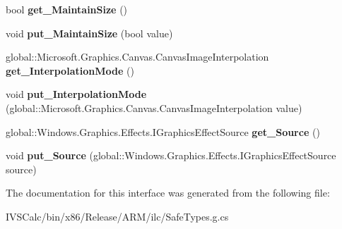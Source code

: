 \begin{DoxyCompactItemize}
bool {\bfseries get\+\_\+\+Maintain\+Size} ()
\item 
\mbox{\label{interface_microsoft_1_1_graphics_1_1_canvas_1_1_effects_1_1_i_straighten_effect_a0d1aa7dfd257a41c147868cb49446ea6}} 
void {\bfseries put\+\_\+\+Maintain\+Size} (bool value)
\item 
\mbox{\label{interface_microsoft_1_1_graphics_1_1_canvas_1_1_effects_1_1_i_straighten_effect_aea853ec4accf5f13bcfef15bd59e5170}} 
global\+::\+Microsoft.\+Graphics.\+Canvas.\+Canvas\+Image\+Interpolation {\bfseries get\+\_\+\+Interpolation\+Mode} ()
\item 
\mbox{\label{interface_microsoft_1_1_graphics_1_1_canvas_1_1_effects_1_1_i_straighten_effect_ac4bd6a5d0b94a9b353c7cf0854c55f83}} 
void {\bfseries put\+\_\+\+Interpolation\+Mode} (global\+::\+Microsoft.\+Graphics.\+Canvas.\+Canvas\+Image\+Interpolation value)
\item 
\mbox{\label{interface_microsoft_1_1_graphics_1_1_canvas_1_1_effects_1_1_i_straighten_effect_a24ea3cfd1f2bd3a3cff7beeb3a4788a4}} 
global\+::\+Windows.\+Graphics.\+Effects.\+I\+Graphics\+Effect\+Source {\bfseries get\+\_\+\+Source} ()
\item 
\mbox{\label{interface_microsoft_1_1_graphics_1_1_canvas_1_1_effects_1_1_i_straighten_effect_a70f0d6dc9433d17ebdcbe3a4b6b4892c}} 
void {\bfseries put\+\_\+\+Source} (global\+::\+Windows.\+Graphics.\+Effects.\+I\+Graphics\+Effect\+Source source)
\end{DoxyCompactItemize}


The documentation for this interface was generated from the following file\+:\begin{DoxyCompactItemize}
\item 
I\+V\+S\+Calc/bin/x86/\+Release/\+A\+R\+M/ilc/Safe\+Types.\+g.\+cs\end{DoxyCompactItemize}
